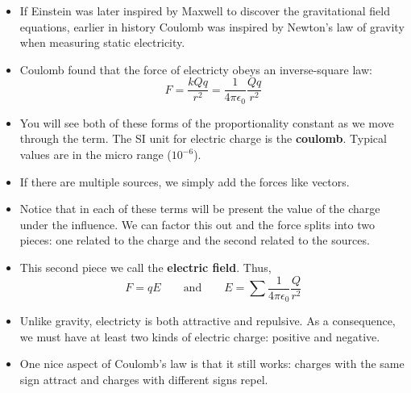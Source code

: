 \documentclass{article}
\begin{document}



%
\begin{itemize}

\item If Einstein was later inspired by Maxwell to discover the gravitational field equations, earlier in history Coulomb was inspired by Newton's law of gravity when measuring static electricity.

\item Coulomb found that the force of electricty obeys an inverse-square law:
%
\begin{equation*}
F = \frac{kQq}{r^2} = \frac{1}{4\pi\epsilon_0}\frac{Qq}{r^2}
\end{equation*}
\item You will see both of these forms of the proportionality constant as we move through the term. The SI unit for electric charge is the \textbf{coulomb}. Typical values are in the micro range (\(10^{-6}\)).

\item If there are multiple sources, we simply add the forces like vectors.

\item Notice that in each of these terms will be present the value of the charge under the influence. We can factor this out and the force splits into two pieces: one related to the charge and the second related to the sources.

\item This second piece we call the \textbf{electric field}. Thus,
%
\begin{equation*}
F = qE
\qquad \text{and} \qquad
E = \sum \frac{1}{4\pi\epsilon_0}\frac{Q}{r^2}
\end{equation*}
\item Unlike gravity, electricty is both attractive and repulsive. As a consequence, we must have at least two kinds of electric charge: positive and negative.

\item One nice aspect of Coulomb's law is that it still works: charges with the same sign attract and charges with different signs repel.

\end{itemize}
\end{document}
